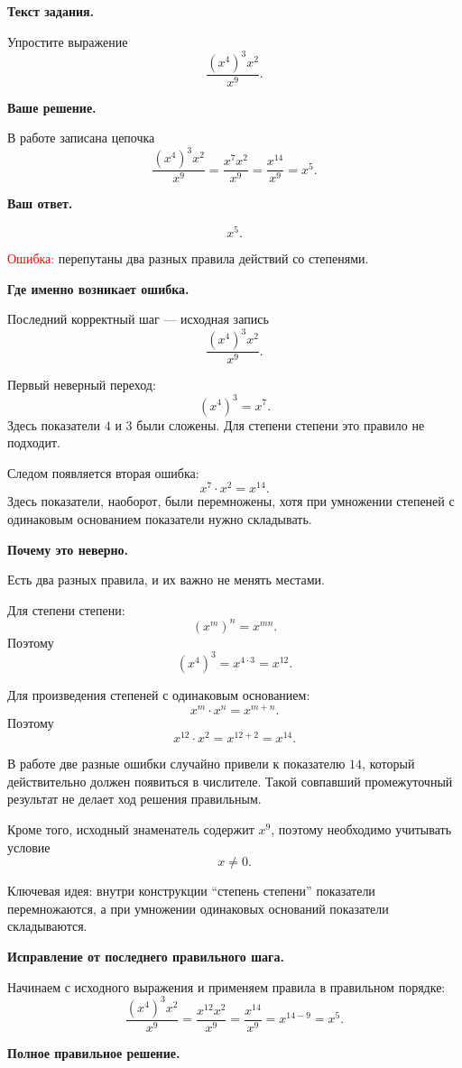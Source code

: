 \documentclass[12pt,a4paper]{article}
\begin{document}
\textbf{Текст задания.}

Упростите выражение
\[
\frac{(x^4)^3x^2}{x^9}.
\]

\textbf{Ваше решение.}

В работе записана цепочка
\[
\frac{(x^4)^3x^2}{x^9}
=
\frac{x^7x^2}{x^9}
=
\frac{x^{14}}{x^9}
=
x^5.
\]

\textbf{Ваш ответ.}

\[
x^5.
\]

\textcolor{red}{Ошибка:} перепутаны два разных правила действий со степенями.

\textbf{Где именно возникает ошибка.}

Последний корректный шаг --- исходная запись
\[
\frac{(x^4)^3x^2}{x^9}.
\]

Первый неверный переход:
\[
(x^4)^3=x^7.
\]
Здесь показатели $4$ и $3$ были сложены. Для степени степени это правило не подходит.

Следом появляется вторая ошибка:
\[
x^7\cdot x^2=x^{14}.
\]
Здесь показатели, наоборот, были перемножены, хотя при умножении степеней с одинаковым основанием показатели нужно складывать.

\textbf{Почему это неверно.}

Есть два разных правила, и их важно не менять местами.

Для степени степени:
\[
(x^m)^n=x^{mn}.
\]
Поэтому
\[
(x^4)^3=x^{4\cdot3}=x^{12}.
\]

Для произведения степеней с одинаковым основанием:
\[
x^m\cdot x^n=x^{m+n}.
\]
Поэтому
\[
x^{12}\cdot x^2=x^{12+2}=x^{14}.
\]

В работе две разные ошибки случайно привели к показателю $14$, который действительно должен появиться в числителе. Такой совпавший промежуточный результат не делает ход решения правильным.

Кроме того, исходный знаменатель содержит $x^9$, поэтому необходимо учитывать условие
\[
x\ne0.
\]

\textcolor{blue!60!black}{Ключевая идея:} внутри конструкции ``степень степени'' показатели перемножаются, а при умножении одинаковых оснований показатели складываются.

\textbf{Исправление от последнего правильного шага.}

Начинаем с исходного выражения и применяем правила в правильном порядке:
\[
\frac{(x^4)^3x^2}{x^9}
=
\frac{x^{12}x^2}{x^9}
=
\frac{x^{14}}{x^9}
=
x^{14-9}
=
x^5.
\]

\textbf{Полное правильное решение.}
\end{document}
